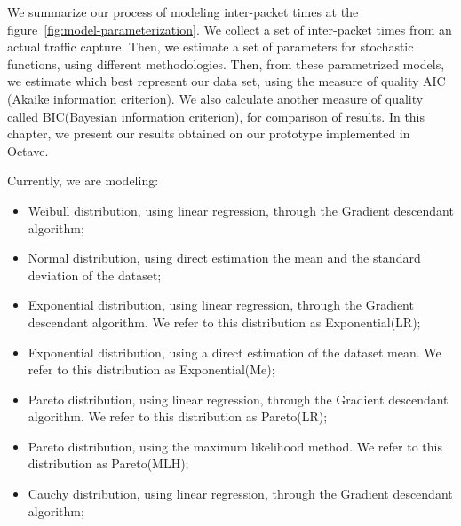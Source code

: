 We summarize our process of modeling inter-packet times at the figure~\ref{fig:model-parameterization}. We collect a set of inter-packet times from an actual traffic capture. Then, we estimate a set of parameters for stochastic functions, using different methodologies. Then, from these parametrized models, we estimate which best represent our data set, using the measure of quality AIC (Akaike information criterion). We also calculate another measure of quality called BIC(Bayesian information criterion), for comparison of results. In this chapter, we present our results obtained on our prototype implemented in Octave.

Currently, we are modeling:

\begin{itemize}
	\item Weibull distribution, using linear regression, through the Gradient descendant algorithm;
	\item Normal distribution, using direct estimation the mean and the standard deviation of the dataset;
	\item Exponential distribution, using linear regression, through the Gradient descendant algorithm. We refer to this distribution as Exponential(LR);
	\item Exponential distribution, using a direct estimation of the dataset mean. We refer to this distribution as Exponential(Me);
	\item Pareto distribution, using linear regression, through the Gradient descendant algorithm. We refer to this distribution as Pareto(LR);
	\item Pareto distribution, using the maximum likelihood method. We refer to this distribution as Pareto(MLH);
	\item Cauchy distribution, using linear regression, through the Gradient descendant algorithm;
\end{itemize}






